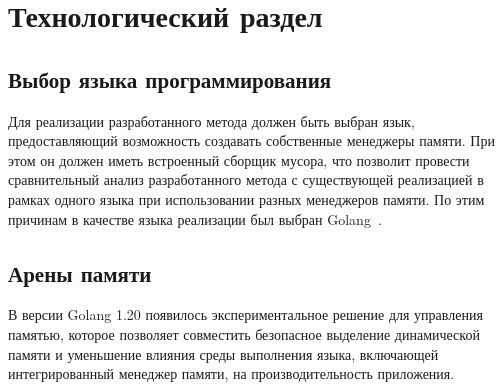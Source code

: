 \chapter{Технологический раздел}



\section{Выбор языка программирования}

Для реализации разработанного метода должен быть выбран язык, предоставляющий возможность создавать собственные менеджеры памяти. При этом он должен иметь встроенный сборщик мусора, что позволит провести сравнительный анализ разработанного метода с существующей реализацией в рамках одного языка при использовании разных менеджеров памяти. По этим причинам в качестве языка реализации был выбран Golang~\cite{golang}.


\clearpage
\section{Арены памяти}

В версии Golang 1.20 появилось экспериментальное решение для управления памятью, которое позволяет совместить безопасное выделение динамической памяти и уменьшение влияния среды выполнения языка, включающей интегрированный менеджер памяти, на производительность приложения.~\cite{golang_arena_cource}


